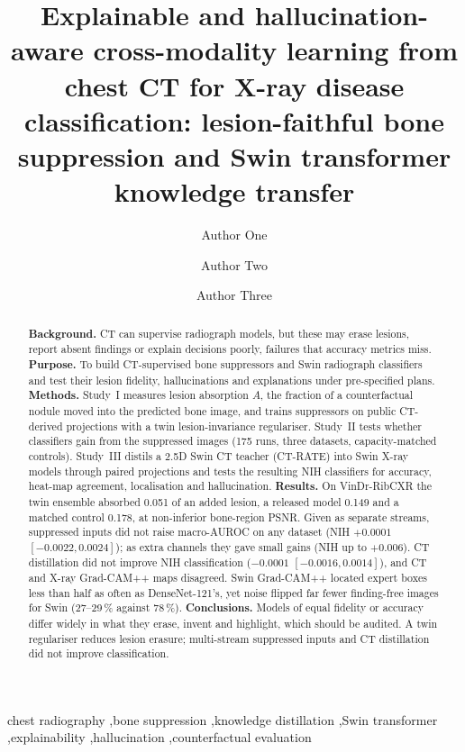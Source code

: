 \documentclass[preprint,12pt,authoryear]{elsarticle}
\begin{document}
\begin{frontmatter}

\title{Explainable and hallucination-aware cross-modality learning from chest CT for X-ray disease classification: lesion-faithful
bone suppression and Swin transformer knowledge transfer}

\author[inst1]{Author One}
\author[inst1]{Author Two}
\author[inst2]{Author Three}
\address[inst1]{Department, University, City, Country}
\address[inst2]{Department, Hospital, City, Country}

\begin{abstract}
\textbf{Background.} CT can supervise radiograph models, but these may erase lesions, report absent findings or explain decisions poorly,
failures that accuracy metrics miss.
\textbf{Purpose.} To build CT-supervised bone suppressors and Swin radiograph classifiers and test their lesion fidelity, hallucinations
and explanations under pre-specified plans.
\textbf{Methods.} Study~I measures lesion absorption $A$, the fraction of a counterfactual nodule moved into the predicted bone image, and
trains suppressors on public CT-derived projections with a twin lesion-invariance regulariser. Study~II tests whether classifiers gain from
the suppressed images (175 runs, three datasets, capacity-matched controls). Study~III distils a 2.5D Swin CT teacher (CT-RATE) into Swin
X-ray models through paired projections and tests the resulting NIH classifiers for accuracy, heat-map agreement, localisation and
hallucination.
\textbf{Results.} On VinDr-RibCXR the twin ensemble absorbed 0.051 of an added lesion, a released model 0.149 and a matched control 0.178,
at non-inferior bone-region PSNR. Given as separate streams, suppressed inputs did not raise macro-AUROC on any dataset (NIH $+0.0001$
$[-0.0022,0.0024]$); as extra channels they gave small gains (NIH up to $+0.006$). CT
distillation did not improve NIH classification ($-0.0001$ $[-0.0016,0.0014]$), and CT and X-ray Grad-CAM++ maps disagreed. Swin
Grad-CAM++ located expert boxes less than half as often as DenseNet-121's, yet noise flipped far fewer finding-free images for Swin
(27--29\,\% against 78\,\%).
\textbf{Conclusions.} Models of equal fidelity or accuracy differ widely in what they erase, invent and highlight, which should be
audited. A twin regulariser reduces lesion erasure; multi-stream suppressed inputs and CT distillation did not improve classification.
\end{abstract}

\begin{keyword}
chest radiography \sep bone suppression \sep knowledge distillation \sep Swin transformer \sep explainability \sep hallucination
\sep counterfactual evaluation
\end{keyword}

\end{frontmatter}
\end{document}
